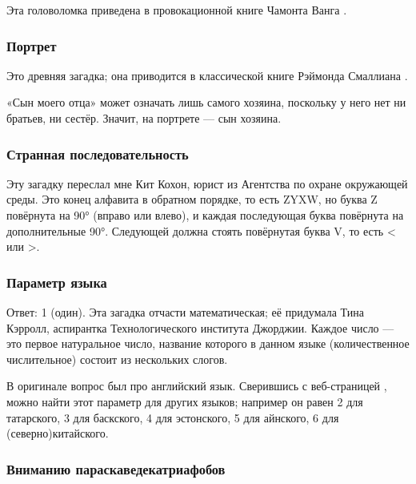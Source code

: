 Эта головоломка приведена в провокационной книге Чамонта Ванга \cite{58}.

\subsubsection*{Портрет}

Это древняя загадка;
она приводится в классической книге Рэймонда Смаллиана \cite{55}.

«Сын моего отца» может означать лишь самого хозяина, поскольку у него нет ни братьев, ни сестёр.
Значит, на портрете — сын хозяина.

\subsubsection*{Странная последовательность}

Эту загадку переслал мне Кит Кохон, юрист из Агентства по охране окружающей среды.
Это конец алфавита в обратном порядке, то есть ZYXW, но буква Z повёрнута на 90° (вправо или влево), и каждая последующая буква повёрнута на дополнительные 90°.
Следующей должна стоять повёрнутая буква V, то есть < или >.

\subsubsection*{Параметр языка}

Ответ: 1 (один).
Эта загадка отчасти математическая; её придумала Тина Кэрролл, аспирантка Технологического института Джорджии. 
Каждое число — это первое натуральное число, название которого в данном языке (количественное числительное) состоит из нескольких слогов.

\begin{addedbytheeditors}
В оригинале вопрос был про английский язык.
Сверившись с веб-страницей \cite{numerals}, можно найти этот параметр для других языков;
например он равен 2 для татарского, 3 для баскского, 4 для эстонского, 5 для айнского, 6 для (северно)китайского. \pr
\end{addedbytheeditors}


\subsubsection*{Вниманию параскаведекатриафобов}

